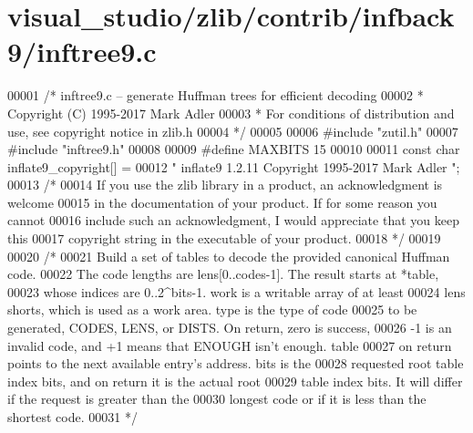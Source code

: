 \hypertarget{visual__studio_2zlib_2contrib_2infback9_2inftree9_8c_source}{}\section{visual\+\_\+studio/zlib/contrib/infback9/inftree9.c}
\label{visual__studio_2zlib_2contrib_2infback9_2inftree9_8c_source}

\begin{DoxyCode}
00001 \textcolor{comment}{/* inftree9.c -- generate Huffman trees for efficient decoding}
00002 \textcolor{comment}{ * Copyright (C) 1995-2017 Mark Adler}
00003 \textcolor{comment}{ * For conditions of distribution and use, see copyright notice in zlib.h}
00004 \textcolor{comment}{ */}
00005 
00006 \textcolor{preprocessor}{#include "zutil.h"}
00007 \textcolor{preprocessor}{#include "inftree9.h"}
00008 
00009 \textcolor{preprocessor}{#define MAXBITS 15}
00010 
00011 \textcolor{keyword}{const} \textcolor{keywordtype}{char} inflate9\_copyright[] =
00012    \textcolor{stringliteral}{" inflate9 1.2.11 Copyright 1995-2017 Mark Adler "};
00013 \textcolor{comment}{/*}
00014 \textcolor{comment}{  If you use the zlib library in a product, an acknowledgment is welcome}
00015 \textcolor{comment}{  in the documentation of your product. If for some reason you cannot}
00016 \textcolor{comment}{  include such an acknowledgment, I would appreciate that you keep this}
00017 \textcolor{comment}{  copyright string in the executable of your product.}
00018 \textcolor{comment}{ */}
00019 
00020 \textcolor{comment}{/*}
00021 \textcolor{comment}{   Build a set of tables to decode the provided canonical Huffman code.}
00022 \textcolor{comment}{   The code lengths are lens[0..codes-1].  The result starts at *table,}
00023 \textcolor{comment}{   whose indices are 0..2^bits-1.  work is a writable array of at least}
00024 \textcolor{comment}{   lens shorts, which is used as a work area.  type is the type of code}
00025 \textcolor{comment}{   to be generated, CODES, LENS, or DISTS.  On return, zero is success,}
00026 \textcolor{comment}{   -1 is an invalid code, and +1 means that ENOUGH isn't enough.  table}
00027 \textcolor{comment}{   on return points to the next available entry's address.  bits is the}
00028 \textcolor{comment}{   requested root table index bits, and on return it is the actual root}
00029 \textcolor{comment}{   table index bits.  It will differ if the request is greater than the}
00030 \textcolor{comment}{   longest code or if it is less than the shortest code.}
00031 \textcolor{comment}{ */}

\end{DoxyCode}
